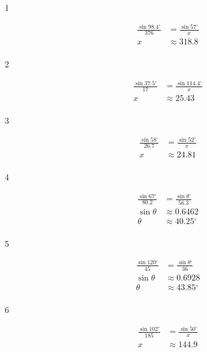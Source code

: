 \documentclass{exam}
\newcommand{\dg}{\ensuremath{^\circ}}
\begin{document}
    \begin{description}

      \item[1] 
        \begin{align*}
          \frac{\sin 98.4 \dg}{376} & = \frac{\sin 57 \dg}{x} \\
          x                         & \approx \boxed{ 318.8 } \\
        \end{align*}

      \item[2] 
        \begin{align*}
          \frac{\sin 37.5 \dg}{17} & = \frac{\sin 114.4 \dg}{x} \\
          x                        & \approx \boxed{ 25.43 } \\
        \end{align*}

      \item[3] 
        \begin{align*}
          \frac{\sin 58 \dg}{26.7} & = \frac{\sin 52 \dg}{x} \\
          x                         & \approx \boxed{ 24.81 } \\
        \end{align*}

      \item[4] 
        \begin{align*}
          \frac{\sin 67 \dg}{80.2} & = \frac{\sin \theta \dg}{56.3} \\
          \sin \theta              & \approx 0.6462 \\
          \theta                   & \approx \boxed{ 40.25 \dg } \\
        \end{align*}

      \item[5] 
        \begin{align*}
          \frac{\sin 120 \dg}{45} & = \frac{\sin \theta \dg}{36} \\
          \sin \theta             & \approx 0.6928 \\
          \theta                  & \approx \boxed{ 43.85 \dg } \\
        \end{align*}

      \item[6] 
        \begin{align*}
          \frac{\sin 102 \dg}{185} & = \frac{\sin 50 \dg}{x} \\
          x                        & \approx \boxed{ 144.9 } \\
        \end{align*}


\end{description}
\end{document}
